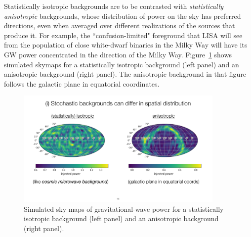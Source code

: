 \documentclass[11pt]{article}
\numberwithin{equation}{section}
\begin{document}
Statistically isotropic backgrounds are to be contrasted
with {\em statistically anisotropic} backgrounds, 
whose distribution of power on the sky has preferred 
directions, even when averaged over different 
realizations of the sources that produce it.
For example, the ``confusion-limited" foreground that 
LISA will see from the population of close white-dwarf 
binaries in the Milky Way will have its GW
power concentrated in the direction of the Milky Way.
Figure~\ref{f:statiso-vs-aniso} shows simulated skymaps 
for a statistically isotropic background (left panel) and an
anisotropic background (right panel). 
The anisotropic background in that figure follows the
galactic plane in equatorial coordinates. 
%
\begin{figure}[htbp!]
\begin{center}
\includegraphics[width=0.9\textwidth]{Figures/statiso-vs-aniso}
\caption{Simulated sky maps of gravitational-wave power
for a statistically isotropic background (left panel) and an 
anisotropic background (right panel).}
\label{f:statiso-vs-aniso}
\end{center}
\end{figure}
%
\end{document}
